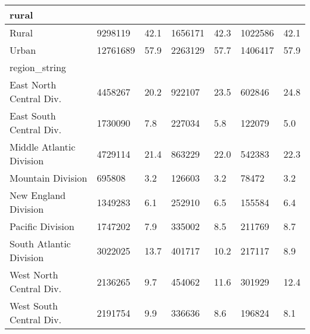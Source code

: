 \begin{longtable}{lllllll}
\midrule
\multicolumn{1}{l}{rural} \\ 
\midrule
Rural & 9298119 & 42.1 & 1656171 & 42.3 & 1022586 & 42.1 \\ 
Urban & 12761689 & 57.9 & 2263129 & 57.7 & 1406417 & 57.9 \\ 
\midrule
\multicolumn{1}{l}{region\_string} \\ 
\midrule
East North Central Div. & 4458267 & 20.2 & 922107 & 23.5 & 602846 & 24.8 \\ 
East South Central Div. & 1730090 & 7.8 & 227034 & 5.8 & 122079 & 5.0 \\ 
Middle Atlantic Division & 4729114 & 21.4 & 863229 & 22.0 & 542383 & 22.3 \\ 
Mountain Division & 695808 & 3.2 & 126603 & 3.2 & 78472 & 3.2 \\ 
New England Division & 1349283 & 6.1 & 252910 & 6.5 & 155584 & 6.4 \\ 
Pacific Division & 1747202 & 7.9 & 335002 & 8.5 & 211769 & 8.7 \\ 
South Atlantic Division & 3022025 & 13.7 & 401717 & 10.2 & 217117 & 8.9 \\ 
West North Central Div. & 2136265 & 9.7 & 454062 & 11.6 & 301929 & 12.4 \\ 
West South Central Div. & 2191754 & 9.9 & 336636 & 8.6 & 196824 & 8.1 \\ 
\bottomrule
\end{longtable}

